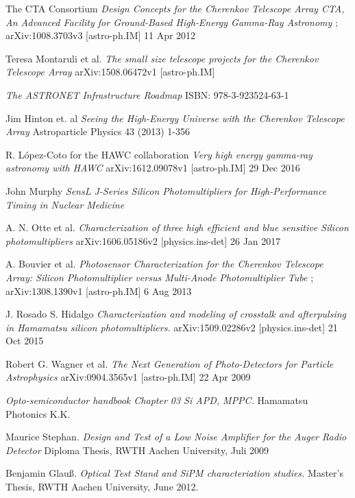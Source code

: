 \documentclass[12pt,article,type=msc,colorback,accentcolor=tud9c]{tudthesis}
\begin{document}
{\begin{thebibliography}{12}
 The CTA Consortium \textit{Design Concepts for the Cherenkov Telescope Array CTA, An Advanced Facility for Ground-Based High-Energy Gamma-Ray Astronomy} ; arXiv:1008.3703v3 [astro-ph.IM] 11 Apr 2012

 Teresa Montaruli et al. \textit{The small size telescope projects for the Cherenkov Telescope Array} arXiv:1508.06472v1 [astro-ph.IM]

 \textit{The ASTRONET Infrastructure Roadmap} ISBN: 978-3-923524-63-1

 Jim Hinton et. al \textit{Seeing the High-Energy Universe with the Cherenkov Telescope Array} Astroparticle Physics 43 (2013) 1-356 

 R. L\'opez-Coto for the HAWC collaboration \textit{Very high energy gamma-ray astronomy with HAWC} arXiv:1612.09078v1 [astro-ph.IM] 29 Dec 2016

 John Murphy \textit{SensL J-Series Silicon Photomultipliers for High-Performance Timing in Nuclear Medicine}

 A. N. Otte et al. \textit{Characterization of three high efficient and blue sensitive Silicon photomultipliers} arXiv:1606.05186v2 [physics.ins-det] 26 Jan 2017

  A. Bouvier et al. \textit{Photosensor Characterization for the Cherenkov Telescope Array: Silicon Photomultiplier versus Multi-Anode Photomultiplier Tube} ; arXiv:1308.1390v1 [astro-ph.IM] 6 Aug 2013

 J. Rosado S. Hidalgo \textit{Characterization and modeling of crosstalk and afterpulsing in Hamamatsu silicon photomultipliers.} arXiv:1509.02286v2 [physics.ins-det] 21 Oct 2015

 Robert G. Wagner et al. \textit{The Next Generation of Photo-Detectors for Particle Astrophysics} arXiv:0904.3565v1 [astro-ph.IM] 22 Apr 2009

 \textit{Opto-semiconductor handbook Chapter 03 Si APD, MPPC.} Hamamatsu Photonics K.K.

 Maurice Stephan. \textit{Design and Test of a Low Noise Amplifier for the Auger Radio Detector} Diploma Thesis, RWTH Aachen University, Juli 2009

 Benjamin Glau\ss. \textit{Optical Test Stand and SiPM characteriation studies.} Master's Thesis, RWTH Aachen University, June 2012.


\end{thebibliography}}
\end{document}
